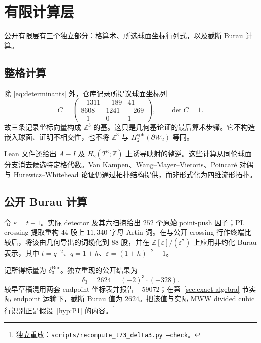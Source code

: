 \documentclass[11pt]{amsart}
\theoremstyle{definition}
\theoremstyle{remark}
\newcommand{\Z}{\mathbb{Z}}
\newcommand{\Bur}{\mathrm{Bur}}
\begin{document}

\section{有限计算层}

公开有限层有三个独立部分：格算术、所选球面坐标行列式，以及截断 Burau 计算。

\subsection{整格计算}

除 \eqref{eq:determinants} 外，仓库记录所提议球面坐标列
\begin{equation}\label{eq:spherecols}
C=\begin{pmatrix}
-1311&-189&41\\
8608&1241&-269\\
-1&0&1
\end{pmatrix},
\qquad \det C=1.
\end{equation}
故三条记录坐标向量构成 $\Z^3$ 的基。这只是几何基论证的最后算术步骤。它不构造嵌入球面、证明不相交性，也不将 $\Z^3$ 与 $H_2^{\mathrm{sph}}(\partial W_2)$ 等同。

Lean 文件还给出 $A-I$ 及 $H_2(T^3;\Z)$ 上诱导映射的整逆。这些计算从同伦球面分支消去候选特定格代数。Van Kampen、Wang--Mayer--Vietoris、Poincaré 对偶与 Hurewicz--Whitehead 论证仍通过拓扑结构提供，而非形式化为四维流形拓扑。

\subsection{公开 Burau 计算}

令 $\varepsilon=t-1$。实际 detector 及其六扫掠给出 $252$ 个原始 point-push 因子；PL crossing 提取重构 $44$ 股上 $11{,}340$ 字母 Artin 词。在与公开 crossing 行作终端比较后，将该由几何导出的词缆化到 $88$ 股，并在 $\Z[\varepsilon]/(\varepsilon^7)$ 上应用非约化 Burau 表示，其中 $t=q^{-2}$、$q=1+h$、$\varepsilon=(1+h)^{-2}-1$。

记所得标量为 $\delta_3^{\Bur}$。独立重现的公开结果为
\begin{equation}\label{eq:burau}
\delta_3=2624=(-2)^3\cdot(-328).
\end{equation}
较早草稿混用两套 endpoint 坐标表并报告 $-59072$；在第~\ref{sec:exact-algebra} 节实际 endpoint 运输下，截断 Burau 值为 $2624$。把该值与实际 MWW divided cubic 行识别正是假设~\ref{hyp:P1} 的内容。\footnote{独立重放：\texttt{scripts/recompute\_t73\_delta3.py --check}。}
\end{document}
